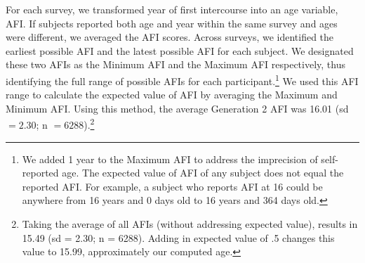 For each survey, we transformed year of first intercourse into an age variable, AFI. If subjects reported both age and year within the same survey and ages were different, we averaged the AFI scores. Across surveys, we identified the earliest possible AFI and the latest possible AFI for each subject. We designated these two AFIs as the Minimum AFI and the Maximum AFI respectively, thus identifying the full range of possible AFIs for each participant.\footnote{We added 1 year to the Maximum AFI to address the imprecision of self-reported age. The expected value of AFI of any subject does not equal the reported AFI. For example, a subject who reports AFI at 16 could be anywhere from 16 years and 0 days old to 16 years and 364 days old.} We used this AFI range to calculate the expected value of AFI by averaging the Maximum and Minimum AFI. Using this method, the average Generation 2 AFI was 16.01 (sd $= 2.30$; n $= 6288$).\footnote{Taking the average of all AFIs (without addressing expected value), results in 15.49 (sd = 2.30; n = 6288). Adding in expected value of .5 changes this value to 15.99, approximately our computed age.}

